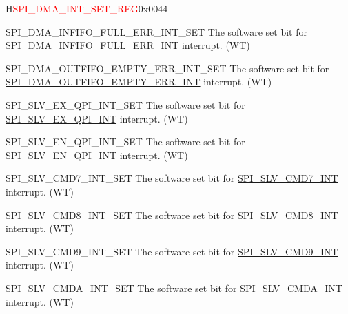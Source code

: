 \begin{register}{H}{\textcolor{red}{SPI\_DMA\_INT\_SET\_REG}}{0x{}0044}\label{regdesc:SPIDMAINTSETREG}
%
%
%
%
%
%
%
%
%
%
%
%
%
%
%
%
%
%
%
%
%
%
\regnewline%
\begin{regdesc}\begin{reglist}
\label{fielddesc:SPIDMAINFIFOFULLERRINTSET}\item [SPI\_DMA\_INFIFO\_FULL\_ERR\_INT\_SET] The software set bit for \hyperref[int:SPIINFIFOFULLERRINT]{SPI\_DMA\_INFIFO\_FULL\_ERR\_INT} interrupt. (WT)
\label{fielddesc:SPIDMAOUTFIFOEMPTYERRINTSET}\item [SPI\_DMA\_OUTFIFO\_EMPTY\_ERR\_INT\_SET] The software set bit for \hyperref[int:SPIOUTFIFOEMPTYERRINT]{SPI\_DMA\_OUTFIFO\_EMPTY\_ERR\_INT} interrupt. (WT)
\label{fielddesc:SPISLVEXQPIINTSET}\item [SPI\_SLV\_EX\_QPI\_INT\_SET] The software set bit for \hyperref[int:SPISLVEXQPIINT]{SPI\_SLV\_EX\_QPI\_INT} interrupt. (WT)
\label{fielddesc:SPISLVENQPIINTSET}\item [SPI\_SLV\_EN\_QPI\_INT\_SET] The software set bit for \hyperref[int:SPISLVENQPIINT]{SPI\_SLV\_EN\_QPI\_INT} interrupt. (WT)
\label{fielddesc:SPISLVCMD7INTSET}\item [SPI\_SLV\_CMD7\_INT\_SET] The software set bit for \hyperref[int:SPISLVCMD7INT]{SPI\_SLV\_CMD7\_INT} interrupt. (WT)
\label{fielddesc:SPISLVCMD8INTSET}\item [SPI\_SLV\_CMD8\_INT\_SET] The software set bit for \hyperref[int:SPISLVCMD8INT]{SPI\_SLV\_CMD8\_INT} interrupt. (WT)
\label{fielddesc:SPISLVCMD9INTSET}\item [SPI\_SLV\_CMD9\_INT\_SET] The software set bit for \hyperref[int:SPISLVCMD9INT]{SPI\_SLV\_CMD9\_INT} interrupt. (WT)
\label{fielddesc:SPISLVCMDAINTSET}\item [SPI\_SLV\_CMDA\_INT\_SET] The software set bit for \hyperref[int:SPISLVCMDAINT]{SPI\_SLV\_CMDA\_INT} interrupt. (WT)


\end{reglist}
\end{regdesc}
\end{register}
